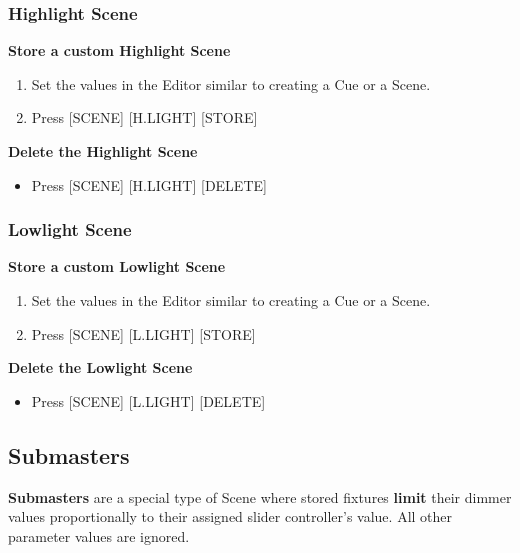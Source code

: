 \documentclass[
]{article}
\providecommand{\tightlist}{%
  \setlength{\itemsep}{0pt}\setlength{\parskip}{0pt}}
\begin{document}
\hypertarget{highlight-scene}{%
\subsubsection{Highlight Scene}\label{highlight-scene}}

\textbf{Store a custom Highlight Scene}

\begin{enumerate}
\def\labelenumi{\arabic{enumi}.}
\item
  Set the values in the Editor similar to creating a Cue or a Scene.
\item
  Press {[}SCENE{]} {[}H.LIGHT{]} {[}STORE{]}
\end{enumerate}

\textbf{Delete the Highlight Scene}

\begin{itemize}
\tightlist
\item
  Press {[}SCENE{]} {[}H.LIGHT{]} {[}DELETE{]}
\end{itemize}

\hypertarget{lowlight-scene}{%
\subsubsection{Lowlight Scene}\label{lowlight-scene}}

\textbf{Store a custom Lowlight Scene}

\begin{enumerate}
\def\labelenumi{\arabic{enumi}.}
\item
  Set the values in the Editor similar to creating a Cue or a Scene.
\item
  Press {[}SCENE{]} {[}L.LIGHT{]} {[}STORE{]}
\end{enumerate}

\textbf{Delete the Lowlight Scene}

\begin{itemize}
\tightlist
\item
  Press {[}SCENE{]} {[}L.LIGHT{]} {[}DELETE{]}
\end{itemize}

\hypertarget{Submasters-10.3}{%
\subsection{Submasters}\label{Submasters-10.3}}

\textbf{Submasters} are a special type of Scene where stored fixtures \textbf{limit} their dimmer values proportionally to their assigned slider controller's value. All other parameter values are ignored.
\end{document}

